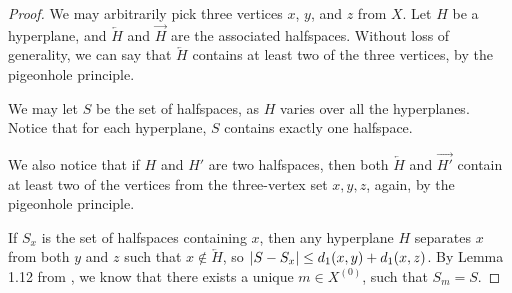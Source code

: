 \documentclass[12pt, a4paper]{article}
\theoremstyle{plain}
\theoremstyle{definition}
\theoremstyle{remark}
\begin{document}
    \begin{proof}
        We may arbitrarily pick three vertices $x$, $y$, and $z$ from $X$. Let $H$ be a hyperplane, and $\overleftarrow{H}$ and $\overrightarrow{H}$ are the associated halfspaces. Without loss of generality, we can say that $\overleftarrow{H}$ contains at least two of the three vertices, by the pigeonhole principle.
        
        We may let $S$ be the set of halfspaces, as $H$ varies over all the hyperplanes. Notice that for each hyperplane, $S$ contains exactly one halfspace.
        
        We also notice that if $H$ and $H'$ are two halfspaces, then both $\overleftarrow{H}$ and $\overrightarrow{H'}$ contain at least two of the vertices from the three-vertex set ${ x, y, z}$, again, by the pigeonhole principle.
        
        If $S_{x}$ is the set of halfspaces containing $x$, then any hyperplane $H$ separates $x$ from both $y$ and $z$ such that $x \notin \overleftarrow{H}$, so $\abs{S - S_{x}} \leq d_{1}(x, y) + d_{1}(x, z)$. By Lemma 1.12 from \cite{hagen}, we know that there exists a unique $m \in X^{(0)}$, such that $S_{m} = S$.
        
    \end{proof}
    
    \nocite{*}
    
    
    
\end{document}
